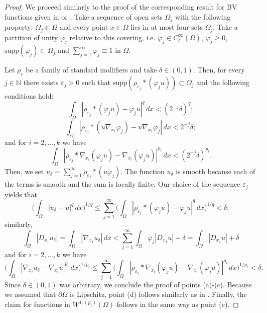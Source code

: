 \documentclass[reqno,12pt]{amsart}
\numberwithin{equation}{section}
\begin{document}
\begin{proof}
We proceed similarly to the proof of the corresponding result for BV functions given in \cite[Theorem 3.9]{AFP} or \cite[Theorem 1.17]{Giu}. Take a sequence of open sets $\Omega_j$ with the following property: $\Omega_j \Subset \Omega$ and every point $x \in \Omega$ lies in at most four sets $\Omega_j$. Take a partition of unity $\varphi_j$ relative to this covering, i.e. $\varphi_j \in C_c^\infty(\Omega)$, $\varphi_j \geq 0$, $\mathrm{supp}(\varphi_j) \subset \Omega_j$ and $\sum_{j=1}^\infty \varphi_j \equiv 1$ in $\Omega$.

Let $\rho_\varepsilon$ be a family of standard mollifiers and take $\delta \in (0,1)$. Then, for every $j \in \mathbb{N}$ there exists $\varepsilon_j > 0$ such that $\mathrm{supp}(\rho_{\varepsilon_j} * (\varphi_j u)) \subset \Omega_j$ and the following conditions hold:
\begin{equation}
\int_{\Omega} |\rho_{\varepsilon_j} * (\varphi_j u) - \varphi_j u|^q \, dx < (2^{-j} \delta)^q;
\end{equation}
\begin{equation}
\int_{\Omega} |\rho_{\varepsilon_j} * (u \nabla_{x_1} \varphi_j ) - u \nabla_{x_1} \varphi_j| \, dx < 2^{-j} \delta;
\end{equation}
and for $i = 2, ..., k$ we have
\begin{equation}
\int_{\Omega} |\rho_{\varepsilon_j} * \nabla_{x_i}(\varphi_j u) - \nabla_{x_i}(\varphi_j u)|^{p_i} \, dx < (2^{-j} \delta)^{p_i}.
\end{equation}
Then, we set $u_\delta = \sum_{j = 1}^\infty \rho_{\varepsilon_j} * (u \varphi_j)$. The function $u_\delta$ is smooth because each of the terms is smooth and the sum is locally finite. Our choice of the sequence $\varepsilon_j$ yields that
\begin{equation}
\bigg( \int_\Omega |u_\delta - u|^q \, dx \bigg)^{1/q} \leq \sum_{j = 1}^\infty \bigg( \int_{\Omega} |\rho_{\varepsilon_j} * (\varphi_j u) - \varphi_j u|^q \, dx \bigg)^{1/q} < \delta;
\end{equation}
similarly,
\begin{equation}
\int_\Omega |D_{x_1} u_\delta| = \int_\Omega |\nabla_{x_1} u_\delta| \, dx < \sum_{j=1}^\infty \int_{\Omega} \varphi_j |D_{x_1} u| + \delta = \int_\Omega |D_{x_1} u| + \delta
\end{equation}
and for $i = 2,...,k$ we have
\begin{equation}
\bigg( \int_\Omega |\nabla_{x_i} u_\delta - \nabla_{x_i} u|^{p_i} \, dx \bigg)^{1/p_i} \leq \sum_{j = 1}^\infty \bigg( \int_{\Omega} |\rho_{\varepsilon_j} * \nabla_{x_i}(\varphi_j u) - \nabla_{x_i}(\varphi_j u)|^{p_i} \, dx \bigg)^{1/p_i} < \delta.
\end{equation}
Since $\delta \in (0,1)$ was arbitrary, we conclude the proof of points (a)-(c). Because we assumed that $\partial\Omega$ is Lipschitz, point (d) follows similarly as in \cite{Giu}. Finally, the claim for functions in $W^{1,(p_i)}(\Omega)$ follows in the same way as point (c).
\end{proof}
\end{document}
